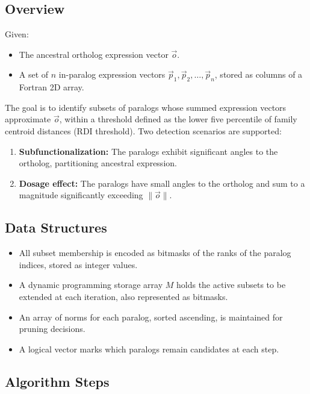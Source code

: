 \documentclass{article}
\begin{document}
\subsection{Overview}

Given:
\begin{itemize}
    \item The ancestral ortholog expression vector $\vec{o}$.
    \item A set of $n$ in-paralog expression vectors $\vec{p}_1, \vec{p}_2, \dots, \vec{p}_n$, stored as columns of a Fortran 2D array.
\end{itemize}

The goal is to identify subsets of paralogs whose summed expression vectors approximate $\vec{o}$, within a threshold defined as the lower five percentile of family centroid distances (RDI threshold). Two detection scenarios are supported:

\begin{enumerate}
    \item \textbf{Subfunctionalization:} The paralogs exhibit significant angles to the ortholog, partitioning ancestral expression.
    \item \textbf{Dosage effect:} The paralogs have small angles to the ortholog and sum to a magnitude significantly exceeding $\|\vec{o}\|$.
\end{enumerate}

\subsection{Data Structures}

\begin{itemize}
    \item All subset membership is encoded as bitmasks of the ranks of the paralog indices, stored as integer values.
    \item A dynamic programming storage array $M$ holds the active subsets to be extended at each iteration, also represented as bitmasks.
    \item An array of norms for each paralog, sorted ascending, is maintained for pruning decisions.
    \item A logical vector marks which paralogs remain candidates at each step.
\end{itemize}

\subsection{Algorithm Steps}
\end{document}
